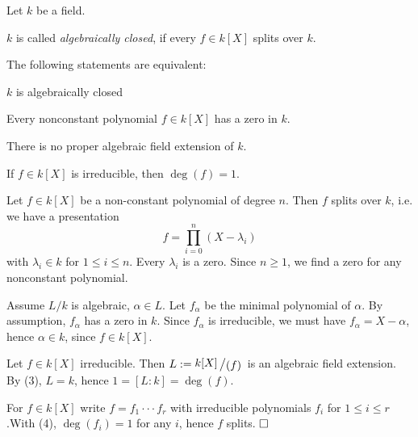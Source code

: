 \documentclass[11pt]{book}
\theoremstyle{nonumberbreak}
\newenvironment{pr}[1][]{\ifthenelse{\equal{#1}{}}{\proof}{\proof[#1]}\rm}{\endproof}
\newenvironment{definprop}[1][]{\ifthenelse{\equal{#1}{}}{\definiprop}{\definiprop[#1]}\rm}{\enddefiniprop}
\newcommand{\slant}[2]{{\raisebox{.1em}{$#1$}\left/\raisebox{-.1em}{$#2$}\right.}}
\begin{document}
\begin{spacing}{1.3}
\begin{definprop} %
Let $k$ be a field.
\begin{compactenum}
\item $k$ is called \textit{algebraically closed}, if every $f \in k[X]$ splits over $k$.
\item The following statements are equivalent:
\begin{compactenum}
\item $k$ is algebraically closed
\item Every nonconstant polynomial $f \in k[X]$ has a zero in $k$.
\item There is no proper algebraic field extension of $k$.
\item If $f \in k[X]$ is irreducible, then $\deg(f)=1$.
\end{compactenum}
\end{compactenum}
\begin{pr}
\begin{compactitem}
\item['(1) $\Rightarrow$ (2)'] Let $f \in k[X]$ be a non-constant polynomial of degree $n$. Then $f$ splits over $k$, i.e. we have a presentation $$f=\prod_{i=0}^n (X-\lambda_i)$$ with $\lambda_i \in k$ for $1\leqslant i \leqslant n$. Every $\lambda_i$ is a zero. Since $n\geqslant 1$, we find a zero for any nonconstant polynomial.
\item['(2) $\Rightarrow$ (3)'] Assume $L/k$ is algebraic, $\alpha \in L$. Let $f_{\alpha}$ be the minimal polynomial of $\alpha$. By assumption, $f_{\alpha}$ has a zero in $k$. Since $f_{\alpha}$ is irreducible, we must have $f_{\alpha}=X-\alpha$, hence $\alpha \in k$, since $f \in k[X]$.

\item['(3) $\Rightarrow$ (4)'] Let $f \in k[X]$ irreducible. Then $L:=\slant{k[X]}{( f)}$ is an algebraic field extension. By (3), $L=k$, hence $1=[L:k]=\deg(f)$.
\item['(4) $\Rightarrow$ (1)'] For $f \in k[X]$ write $f=f_1 \cdot \cdot \cdot f_r$ with irreducible polynomials $f_i$ for $1\leqslant i \leqslant r$.\newline With (4), $\deg(f_i)=1$ for any $i$, hence $f$ splits. $\hfill \Box$

\end{compactitem}
\end{pr}
\end{definprop}




\end{spacing}
\end{document}
